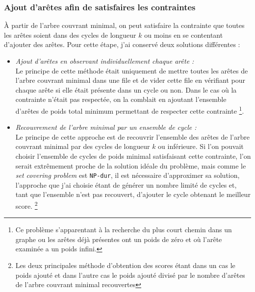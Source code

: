 \documentclass[a4paper,12pt]{article}
\begin{document}
\subsubsection{Ajout d'arêtes afin de satisfaires les contraintes}
À partir de l'arbre couvrant minimal, on peut satisfaire la contrainte que
toutes les arêtes soient dans des cycles de longueur $k$ ou moins en se
contentant d'ajouter des arêtes. Pour cette étape, j'ai conservé deux solutions
différentes :
\begin{itemize}
\item {\em Ajout d'arêtes en observant individuellement chaque arête :}\\
  Le principe de cette méthode était uniquement de mettre toutes les arêtes de
  l'arbre couvrant minimal dans une file et de vider cette file en vérifiant
  pour chaque arête si elle était présente dans un cycle ou non. Dans le cas où
  la contrainte n'était pas respectée, on la comblait en ajoutant l'ensemble
  d'arêtes de poids total minimum permettant de respecter cette contrainte
  \footnote{Ce problème s'apparentant à la recherche du plus court chemin dans
    un graphe ou les arêtes déjà présentes ont un poids de zéro et où l'arête
    examinée a un poids infini.}.
\item {\em Recouvrement de l'arbre minimal par un ensemble de cycle :}\\
  Le principe de cette approche est de recouvrir l'ensemble des arêtes de
  l'arbre couvrant minimal par des cycles de longueur $k$ ou inférieure. Si l'on
  pouvait choisir l'ensemble de cycles de poids minimal satisfaisant cette
  contrainte, l'on serait extrêmement proche de la solution idéale du problème,
  mais comme le {\em set covering problem} est \verb!NP-dur!, il est nécessaire
  d'approximer sa solution, l'approche que j'ai choisie étant de générer un
  nombre limité de cycles et, tant que l'ensemble n'est pas recouvert, d'ajouter
  le cycle obtenant le meilleur score.
  \footnote{Les deux principales méthode d'obtention des scores étant dans un
    cas le poids ajouté et dans l'autre cas le poids ajouté divisé par le nombre
    d'arêtes de l'arbre couvrant minimal recouvertes}
\end{itemize}
\end{document}
